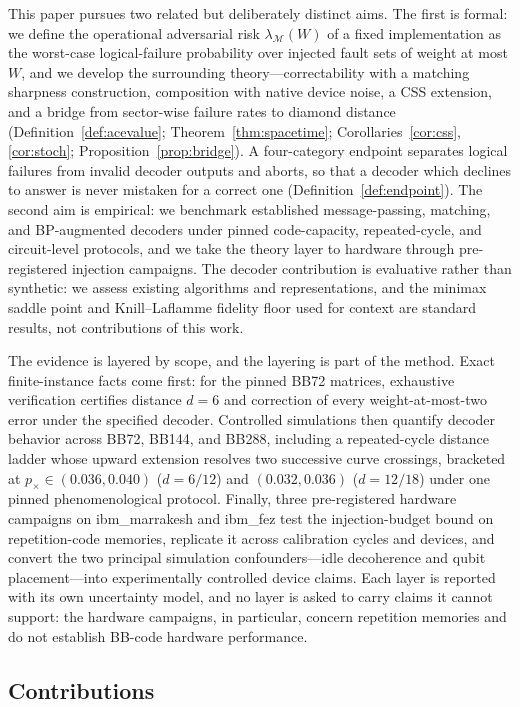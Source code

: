 \documentclass[pdflatex,sn-mathphys-num]{sn-jnl}
\theoremstyle{thmstyleone}
\theoremstyle{thmstyletwo}
\theoremstyle{thmstylethree}
\begin{document}
This paper pursues two related but deliberately distinct aims. The first is formal: we define the operational adversarial risk $\lambda_{\mathcal{M}}(W)$ of a fixed implementation as the worst-case logical-failure probability over injected fault sets of weight at most $W$, and we develop the surrounding theory---correctability with a matching sharpness construction, composition with native device noise, a CSS extension, and a bridge from sector-wise failure rates to diamond distance (Definition~\ref{def:acevalue}; Theorem~\ref{thm:spacetime}; Corollaries~\ref{cor:css}, \ref{cor:stoch}; Proposition~\ref{prop:bridge}). A four-category endpoint separates logical failures from invalid decoder outputs and aborts, so that a decoder which declines to answer is never mistaken for a correct one (Definition~\ref{def:endpoint}). The second aim is empirical: we benchmark established message-passing, matching, and BP-augmented decoders under pinned code-capacity, repeated-cycle, and circuit-level protocols, and we take the theory layer to hardware through pre-registered injection campaigns. The decoder contribution is evaluative rather than synthetic: we assess existing algorithms and representations, and the minimax saddle point and Knill--Laflamme fidelity floor used for context are standard results, not contributions of this work.

The evidence is layered by scope, and the layering is part of the method. Exact finite-instance facts come first: for the pinned BB72 matrices, exhaustive verification certifies distance $d=6$ and correction of every weight-at-most-two error under the specified decoder. Controlled simulations then quantify decoder behavior across BB72, BB144, and BB288, including a repeated-cycle distance ladder whose upward extension resolves two successive curve crossings, bracketed at $p_{\times}\in(0.036,0.040)$ ($d{=}6/12$) and $(0.032,0.036)$ ($d{=}12/18$) under one pinned phenomenological protocol. Finally, three pre-registered hardware campaigns on ibm\_marrakesh and ibm\_fez test the injection-budget bound on repetition-code memories, replicate it across calibration cycles and devices, and convert the two principal simulation confounders---idle decoherence and qubit placement---into experimentally controlled device claims. Each layer is reported with its own uncertainty model, and no layer is asked to carry claims it cannot support: the hardware campaigns, in particular, concern repetition memories and do not establish BB-code hardware performance.

\subsection{Contributions}
\end{document}
